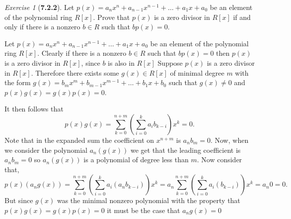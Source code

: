 \documentclass[12pt]{amsart}
\makeatletter
\theoremstyle{remark}
\newtheorem*{exercise}{Exercise}%
\renewenvironment{proof}[1][\proofname]{\par\doublespacing
  \pushQED{\qed}%
  \normalfont \topsep6\p@\@plus6\p@\relax
  \list{}{%
    \settowidth{\leftmargin}{\itshape\proofname:\hskip\labelsep}%
    \setlength{\labelwidth}{0pt}%
    \setlength{\itemindent}{-\leftmargin}%
  }%
  \item[\hskip\labelsep\itshape#1\@addpunct{:}]\ignorespaces
}{%
  \popQED\endlist\@endpefalse
  \singlespacing
}
\theoremstyle{mycomment}
\makeatother
\begin{document}
\begin{exercise}[\textbf{7.2.2}] Let $p(x) = a_nx^n + a_{n - 1}x^{n - 1} + \dots + a_1x + a_0$ be an element of the polynomial 
  ring $R[x]$. Prove that $p(x)$ is a zero divisor in $R[x]$ if and only if there is a nonzero $b \in R$ such that 
  $bp(x) = 0$. 
    \begin{proof} Let $p(x) = a_nx^n + a_{n - 1}x^{n - 1} + \dots + a_1x + a_0$ be an element of the polynomial 
      ring $R[x]$. Clearly if there is a nonzero $b \in R$ such that $bp(x) = 0$ then $p(x)$ is a zero divisor in $R[x]$, 
      since $b$ is also in $R[x]$ Suppose $p(x)$ is a zero divisor in $R[x]$. Therefore there exists some $g(x) \in R[x]$ of
       minimal degree $m$ with the form $g(x) = b_mx^m + b_{m - 1}x^{m - 1} + \dots + b_1x + b_0$ such that $g(x) \neq 0$ and $p(x)g(x) = g(x)p(x) = 0$.
       
       It then follows that 
      \begin{equation*}
      p(x)g(x) = \sum_{k = 0}^{n + m} \left(\sum_{i = 0}^k a_ib_{k - i}\right) x^k = 0.
      \end{equation*}
      Note that in the expanded sum the coefficient on $x^{n + m}$ is $a_nb_m = 0$. Now, when we consider the 
      polynomial $a_n(g(x))$ we get that the leading coefficient is $a_nb_m = 0$ so $a_n(g(x))$ is a polynomial of degree 
      less than $m$. Now consider that, 
      \begin{equation*}
        p(x)(a_n g(x)) = \sum_{k = 0}^{n + m} \left(\sum_{i = 0}^k a_i(a_nb_{k - i})\right) x^k = a_n \sum_{k = 0}^{n + m} \left(\sum_{i = 0}^k a_i(b_{k - i})\right) x^k = a_n 0 = 0.
      \end{equation*}
      But since $g(x)$ was the minimal nonzero polynomial with the property that $p(x)g(x) = g(x)p(x) = 0$ it must be the case that $a_ng(x) = 0$


\end{proof}
\end{exercise}
\end{document}
